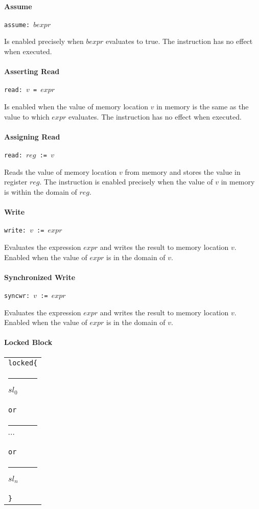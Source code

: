 \documentclass[a4paper]{article}
\begin{document}
\paragraph{Assume} \verb+assume: +$bexpr$

Is enabled precisely when $bexpr$ evaluates to true. The instruction
has no effect when executed.

\paragraph{Asserting Read} \verb+read: +$v$\verb+ = +$expr$

Is enabled when the value of memory location $v$ in memory is the same
as the value to which $expr$ evaluates. The instruction has no effect
when executed.

\paragraph{Assigning Read} \verb+read: +$reg$\verb+ := +$v$

Reads the value of memory location $v$ from memory and stores the
value in register $reg$. The instruction is enabled precisely when the
value of $v$ in memory is within the domain of $reg$.

\paragraph{Write} \verb+write: +$v$\verb+ := +$expr$

Evaluates the expression $expr$ and writes the result to memory
location $v$. Enabled when the value of $expr$ is in the domain of
$v$.

\paragraph{Synchronized Write} \verb+syncwr: +$v$\verb+ := +$expr$

Evaluates the expression $expr$ and writes the result to memory
location $v$. Enabled when the value of $expr$ is in the domain of
$v$.

\paragraph{Locked Block} \mbox{}

\noindent
\begin{tabular}{@{}l@{}}
  \verb+locked{+\\
  \rule{5pt}{0pt}$sl_0$\\
  \verb+or+\\
  \rule{5pt}{0pt}$\cdots$\\
  \verb+or+\\
  \rule{5pt}{0pt}$sl_n$\\
  \verb+}+\\
\end{tabular}
\end{document}
